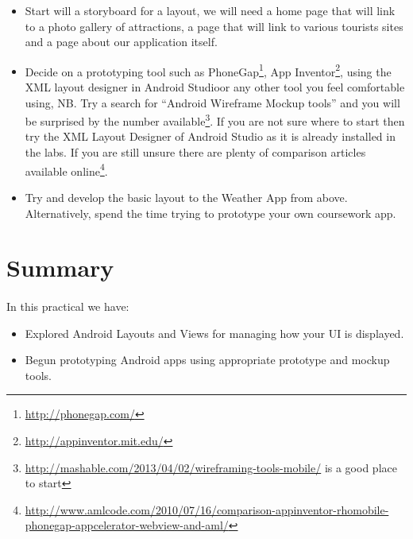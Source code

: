 \begin{itemize}
\item Start will a storyboard for a layout, we will need a home page that will link to a photo gallery of attractions, a page that will link to various tourists sites and a page about our application itself.
\item Decide on a prototyping tool such as PhoneGap\footnote{\url{http://phonegap.com/}}, App Inventor\footnote{\url{http://appinventor.mit.edu/}}, using the XML layout designer in Android Studioor any other tool you feel comfortable using, NB. Try a search for ``Android Wireframe Mockup tools'' and you will be surprised by the number available\footnote{\url{http://mashable.com/2013/04/02/wireframing-tools-mobile/} is a good place to start}. If you are not sure where to start then try the XML Layout Designer of Android Studio as it is already installed in the labs. If you are still unsure there are plenty of comparison articles available online\footnote{\url{http://www.amlcode.com/2010/07/16/comparison-appinventor-rhomobile-phonegap-appcelerator-webview-and-aml/}}.
\item Try and develop the basic layout to the Weather App from above. Alternatively,  spend the time trying to prototype your own coursework app.
\end{itemize}

\section{Summary}
\paragraph{} In this practical we have: 

\begin{itemize}
\item Explored Android Layouts and Views for managing how your UI is displayed.
\item Begun prototyping Android apps using appropriate prototype and mockup tools.
\end{itemize}
